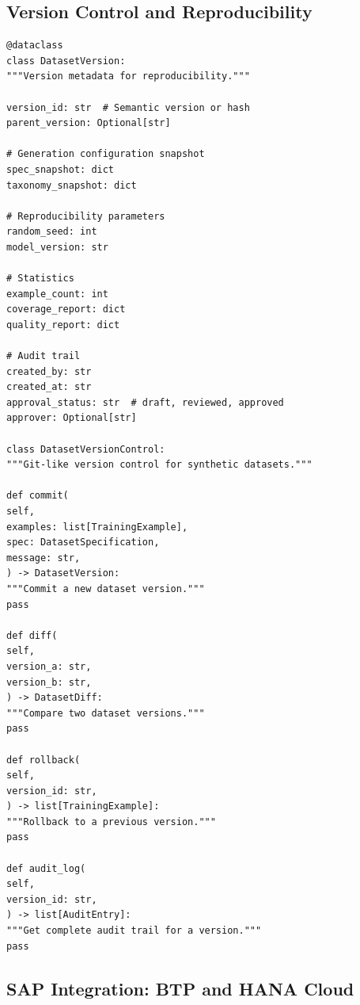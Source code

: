 \documentclass[12pt,a4paper,twoside]{report}
\begin{document}
\subsection{Version Control and Reproducibility}

\begin{lstlisting}[language=jsonx,caption={Git-like versioning for datasets.}]
@dataclass
class DatasetVersion:
"""Version metadata for reproducibility."""

version_id: str  # Semantic version or hash
parent_version: Optional[str]

# Generation configuration snapshot
spec_snapshot: dict
taxonomy_snapshot: dict

# Reproducibility parameters
random_seed: int
model_version: str

# Statistics
example_count: int
coverage_report: dict
quality_report: dict

# Audit trail
created_by: str
created_at: str
approval_status: str  # draft, reviewed, approved
approver: Optional[str]

class DatasetVersionControl:
"""Git-like version control for synthetic datasets."""

def commit(
self,
examples: list[TrainingExample],
spec: DatasetSpecification,
message: str,
) -> DatasetVersion:
"""Commit a new dataset version."""
pass

def diff(
self,
version_a: str,
version_b: str,
) -> DatasetDiff:
"""Compare two dataset versions."""
pass

def rollback(
self,
version_id: str,
) -> list[TrainingExample]:
"""Rollback to a previous version."""
pass

def audit_log(
self,
version_id: str,
) -> list[AuditEntry]:
"""Get complete audit trail for a version."""
pass
\end{lstlisting}

\subsection{SAP Integration: BTP and HANA Cloud}
\end{document}
